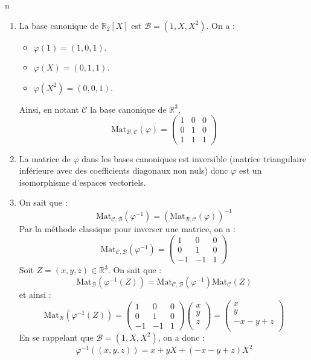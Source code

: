 n\documentclass[a4paper,10pt]{report}
\begin{document}
\corr \begin{enumerate}
\item La base canonique de $\mathbb{R}_2[X]$ est $\mathcal{B}=(1,X,X^2)$. On a :
\begin{itemize}
\item $\varphi(1) = (1,0,1)$.
\item $\varphi(X) = (0, 1, 1)$. 
\item $\varphi(X^2) = (0, 0, 1)$.
\end{itemize}
Ainsi, en notant $\mathcal{C}$ la base canonique de $\mathbb{R}^3$,
$$ \textrm{Mat}_{\mathcal{B}, \mathcal{C}}(\varphi) = \begin{pmatrix}
1 & 0 & 0 \\
0 & 1 & 0 \\
1 & 1 & 1 
\end{pmatrix}$$
\item La matrice de $\varphi$ dans les bases canoniques est inversible (matrice triangulaire inférieure avec des coefficients diagonaux non nuls) donc $\varphi$ est un isomorphisme d'espaces vectoriels. 

\item On sait que :
$$ \textrm{Mat}_{\mathcal{C}, \mathcal{B}}(\varphi^{-1}) = (\textrm{Mat}_{\mathcal{B}, \mathcal{C}}(\varphi))^{-1}$$
Par la méthode classique pour inverser une matrice, on a :
$$\textrm{Mat}_{\mathcal{C}, \mathcal{B}}(\varphi^{-1}) = \begin{pmatrix}
1 & 0 & 0 \\
0 & 1 & 0 \\
-1 & -1 & 1 
\end{pmatrix}$$
Soit $Z=(x,y,z) \in \mathbb{R}^3$. On sait que :
$$ \textrm{Mat}_{\mathcal{B}}(\varphi^{-1}(Z)) = \textrm{Mat}_{\mathcal{C}, \mathcal{B}}(\varphi^{-1}) \textrm{Mat}_{\mathcal{C}}(Z)$$
et ainsi :
$$ \textrm{Mat}_{\mathcal{B}}(\varphi^{-1}(Z)) = \begin{pmatrix}
1 & 0 & 0 \\
0 & 1 & 0 \\
-1 & -1 & 1 
\end{pmatrix} \begin{pmatrix}
x \\
y \\
z \\
\end{pmatrix} = \begin{pmatrix}
x \\
y \\
-x-y+z \\
\end{pmatrix}$$
En se rappelant que $\mathcal{B}=(1,X,X^2)$, on a donc :
$$ \varphi^{-1}((x,y,z)) = x + y X + (-x-y+z)X^2$$
\end{enumerate}
\end{document}
